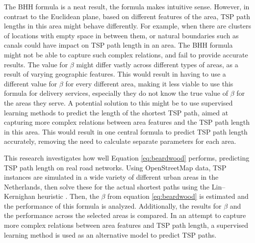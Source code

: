The BHH formula is a neat result, the formula makes intuitive sense. However, in contrast to the 
Euclidean plane, based on different features of the area, TSP path lengths in this area might 
behave differently. For example, when there are clusters of locations with empty space in between 
them, or natural boundaries such as canals could have impact on TSP path length in an area. The 
BHH formula might not be able to capture such complex relations, and fail to provide accurate results.
The value for $\beta$ might differ vastly across different types of areas, as a result of varying geographic
features.
This would result in having to use a different value for $\beta$ for every different area, making it less 
viable to use this formula for delivery services, especially they do not know the true value of $\beta$ for the areas they serve.
A potential solution to this might be to use supervised learning methods to predict the length of the shortest TSP path, 
aimed at capturing more complex relations between area features and the TSP path length in this area.
This would result in one central formula to predict TSP path length accurately, removing the need to calculate
separate parameters for each area.

This research investigates how well Equation \ref{eq:beardwood} performs, predicting TSP path length on real road networks. 
Using OpenStreetMap \citep{openstreetmap} data, TSP instances are simulated in a wide variety of different urban areas
in the Netherlands, then solve these for the actual shortest paths using the Lin–Kernighan heuristic \citep{lin1973effective}.
Then, the $\beta$ from equation \ref{eq:beardwood} is estimated and the performance of this formula is analyzed. 
Additionally, the results for $\beta$ and the performance across the selected areas is compared. In an attempt to capture
more complex relations between area features and TSP path length, a supervised learning method is used as an alternative 
model to predict TSP paths.

